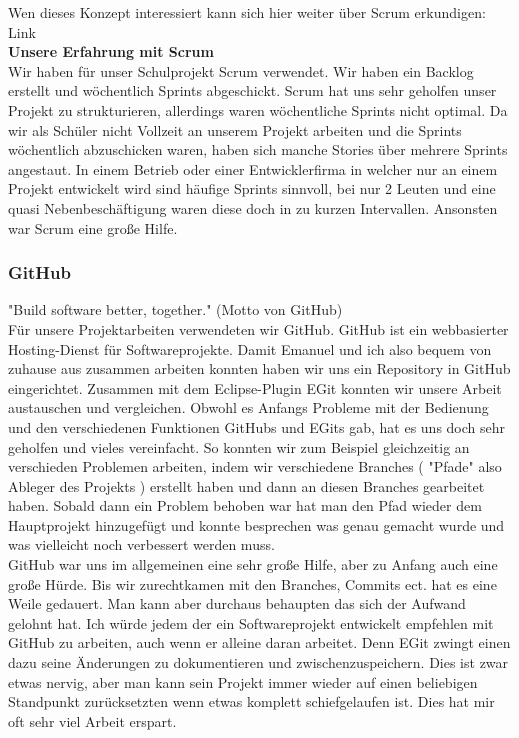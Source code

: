 Wen dieses Konzept interessiert kann sich hier weiter über Scrum erkundigen: Link\\

\textbf{Unsere Erfahrung mit Scrum}\\

Wir haben für unser Schulprojekt Scrum verwendet. Wir haben ein Backlog erstellt und wöchentlich Sprints abgeschickt. Scrum hat uns sehr geholfen unser Projekt zu strukturieren, allerdings waren wöchentliche Sprints nicht optimal. Da wir als Schüler nicht Vollzeit an unserem Projekt arbeiten und die Sprints wöchentlich abzuschicken waren, haben sich manche Stories über mehrere Sprints angestaut. In einem Betrieb oder einer Entwicklerfirma in welcher nur an einem Projekt entwickelt wird sind häufige Sprints sinnvoll, bei nur 2 Leuten und eine quasi Nebenbeschäftigung waren diese doch in zu kurzen Intervallen. Ansonsten war Scrum eine große Hilfe.




\subsubsection{GitHub} \label{sssec:GitHub}
"Build software better, together." (Motto von GitHub)\\

Für unsere Projektarbeiten verwendeten wir GitHub. GitHub ist ein webbasierter Hosting-Dienst für 
Softwareprojekte. Damit Emanuel und ich also bequem von zuhause aus zusammen arbeiten konnten haben 
wir uns ein Repository in GitHub eingerichtet. Zusammen mit dem Eclipse-Plugin EGit konnten wir 
unsere Arbeit austauschen und vergleichen. Obwohl es Anfangs Probleme mit der Bedienung und den 
verschiedenen Funktionen GitHubs und EGits gab, hat es uns doch sehr geholfen und vieles 
vereinfacht. So konnten wir zum Beispiel gleichzeitig an verschieden Problemen arbeiten, indem wir 
verschiedene Branches ( "Pfade" also Ableger des Projekts ) erstellt haben und dann an diesen 
Branches gearbeitet haben. Sobald dann ein Problem behoben war hat man den Pfad wieder dem 
Hauptprojekt hinzugefügt und konnte besprechen was genau gemacht wurde und was vielleicht noch 
verbessert werden muss.\\

GitHub war uns im allgemeinen eine sehr große Hilfe, aber zu Anfang auch eine große Hürde. Bis wir 
zurechtkamen mit den Branches, Commits ect. hat es eine Weile gedauert. Man kann aber durchaus 
behaupten das sich der Aufwand gelohnt hat. Ich würde jedem der ein Softwareprojekt entwickelt 
empfehlen mit GitHub zu arbeiten, auch wenn er alleine daran arbeitet. Denn EGit zwingt einen dazu 
seine Änderungen zu dokumentieren und zwischenzuspeichern. Dies ist zwar etwas nervig, aber man 
kann 
sein Projekt immer wieder auf einen beliebigen Standpunkt zurücksetzten wenn etwas komplett 
schiefgelaufen ist. Dies hat mir oft sehr viel Arbeit erspart.\\


